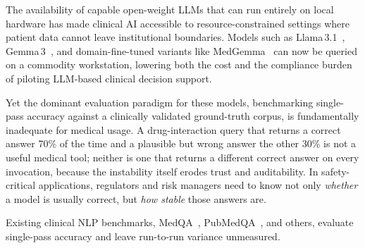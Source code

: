 \documentclass[11pt]{article}
\begin{document}
The availability of capable open-weight LLMs that can run entirely
on local hardware has made clinical AI accessible to resource-constrained
settings where patient data cannot leave institutional boundaries.
Models such as Llama\,3.1~\cite{dubey2024llama3},
Gemma\,3~\cite{team2024gemma}, and domain-fine-tuned variants like
MedGemma~\cite{medgemma2024} can now be queried on a commodity
workstation, lowering both the cost and the compliance burden of
piloting LLM-based clinical decision support.

Yet the dominant evaluation paradigm for these models, benchmarking
single-pass accuracy against a clinically validated ground-truth corpus, 
is fundamentally inadequate for medical usage.
A drug-interaction query that returns a correct answer 70\% of the time
and a plausible but wrong answer the other 30\% is not a useful medical
tool; neither is one that returns a different correct answer on every
invocation, because the instability itself erodes trust and
auditability.
In safety-critical applications, regulators and risk managers need to
know not only \emph{whether} a model is usually correct, but
\emph{how stable} those answers are.

Existing clinical NLP benchmarks, MedQA~\cite{jin2021disease},
PubMedQA~\cite{jin2019pubmedqa}, and others, evaluate single-pass
accuracy and leave run-to-run variance unmeasured.
\end{document}
